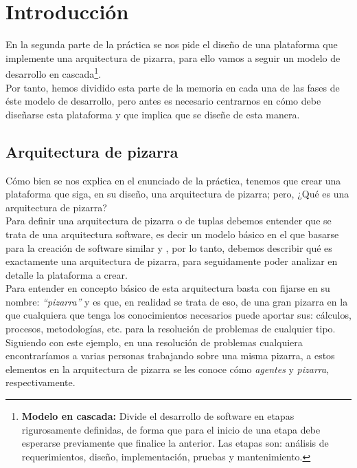 \chapter{Introducción}
\lettrine[lines=1,slope=4pt,findent=0pt]{E}{}n la segunda parte de la práctica se nos pide el diseño de una plataforma que implemente una arquitectura de pizarra, para ello vamos a seguir un modelo de desarrollo en cascada\footnote{\textbf{Modelo en cascada:} Divide el desarrollo de software en etapas rigurosamente definidas, de forma que para el inicio de una etapa debe esperarse previamente que finalice la anterior. Las etapas son: análisis de requerimientos, diseño, implementación, pruebas y mantenimiento.}.\\

Por tanto, hemos dividido esta parte de la memoria en cada una de las fases de éste modelo de desarrollo, pero antes es necesario centrarnos en cómo debe diseñarse esta plataforma y que implica que se diseñe de esta manera.

\section{Arquitectura de pizarra}
Cómo bien se nos explica en el enunciado de la práctica, tenemos que crear una plataforma que siga, en su diseño, una arquitectura de pizarra; pero, ¿Qué es una arquitectura de pizarra?\\

Para definir una arquitectura de pizarra o de tuplas debemos entender que se trata de una arquitectura software, es decir un modelo básico en el que basarse para la creación de software similar y , por lo tanto, debemos describir qué es exactamente una arquitectura de pizarra, para seguidamente poder analizar en detalle la plataforma a crear.\\

Para entender en concepto básico de esta arquitectura basta con fijarse en su nombre: \emph{\textquotedblleft pizarra\textquotedblright} y es que, en realidad se trata de eso, de una gran pizarra en la que cualquiera que tenga los conocimientos necesarios puede aportar sus: cálculos, procesos, metodologías, etc. para la resolución de problemas de cualquier tipo.\\

Siguiendo con este ejemplo, en una resolución de problemas cualquiera encontraríamos a varias personas trabajando sobre una misma pizarra, a estos elementos en la arquitectura de pizarra se les conoce cómo \emph{agentes} y \emph{pizarra}, respectivamente.\\

